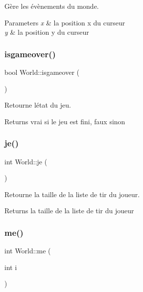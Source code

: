 Gère les évènements du monde. 


\begin{DoxyParams}{Parameters}
{\em x} & la position x du curseur \\
\hline
{\em y} & la position y du curseur \\
\hline
\end{DoxyParams}
\mbox{\label{classWorld_a321628349a53070bd5cfa209987fbf4a}} 
\subsubsection{\texorpdfstring{isgameover()}{isgameover()}}
{\footnotesize\ttfamily bool World\+::isgameover (\begin{DoxyParamCaption}{ }\end{DoxyParamCaption})}



Retourne l\textquotesingle{}état du jeu. 

\begin{DoxyReturn}{Returns}
vrai si le jeu est fini, faux sinon 
\end{DoxyReturn}
\mbox{\label{classWorld_a804aaaacc7e7ce0cad149e419a497842}} 
\subsubsection{\texorpdfstring{je()}{je()}}
{\footnotesize\ttfamily int World\+::je (\begin{DoxyParamCaption}{ }\end{DoxyParamCaption})}



Retourne la taille de la liste de tir du joueur. 

\begin{DoxyReturn}{Returns}
la taille de la liste de tir du joueur 
\end{DoxyReturn}
\mbox{\label{classWorld_a5793d35698e731469c63a9dff298ea0a}} 
\subsubsection{\texorpdfstring{me()}{me()}}
{\footnotesize\ttfamily int World\+::me (\begin{DoxyParamCaption}\item[{int}]{i }\end{DoxyParamCaption})}



